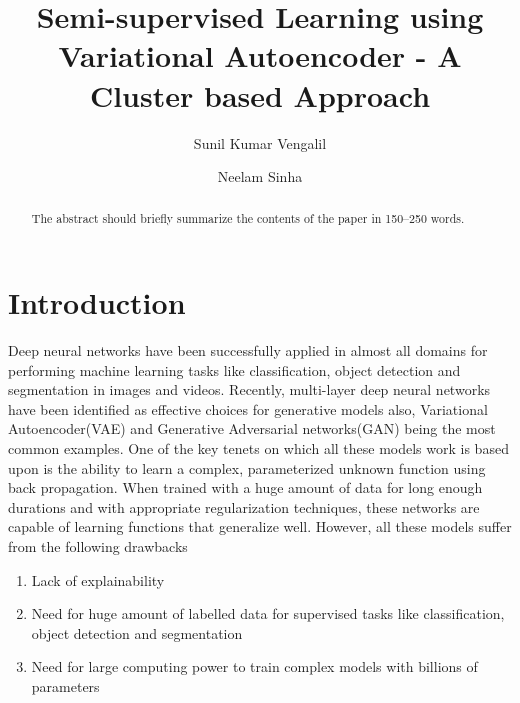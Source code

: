 \documentclass[runningheads]{llncs}
\begin{document}
%
\title{Semi-supervised Learning using Variational Autoencoder - A Cluster based Approach}
%
%
\author{Sunil Kumar Vengalil \and
Neelam Sinha }
%
%
%
\maketitle              %
%
\begin{abstract}
The abstract should briefly summarize the contents of the paper in
150--250 words.

\end{abstract}
%
%
%
\section{Introduction}
Deep neural networks have been successfully applied in almost all domains for performing machine learning tasks like classification\cite{alexnet,vggnet,resnet}, object detection\cite{faster_rcnn,yolo} and segmentation\cite{deeplab,unet} in images and videos.
Recently, multi-layer deep neural networks have been identified as  effective  choices for  generative models also, Variational Autoencoder(VAE)\cite{vae} and Generative Adversarial networks(GAN)\cite{gan} being the most common examples.
One of the key tenets on which all these models work is  based upon  is the ability to learn a complex, parameterized unknown function using back propagation.
When trained with a huge amount of data for long enough durations and with appropriate regularization techniques, these networks are capable of learning functions that generalize well.
However, all these  models suffer from the following drawbacks
\begin{enumerate}
  \item Lack of explainability
  \item Need for huge amount of labelled data for supervised tasks like classification, object detection and segmentation
  \item Need for large computing power to train complex models with billions of parameters
\end{enumerate}
\end{document}
